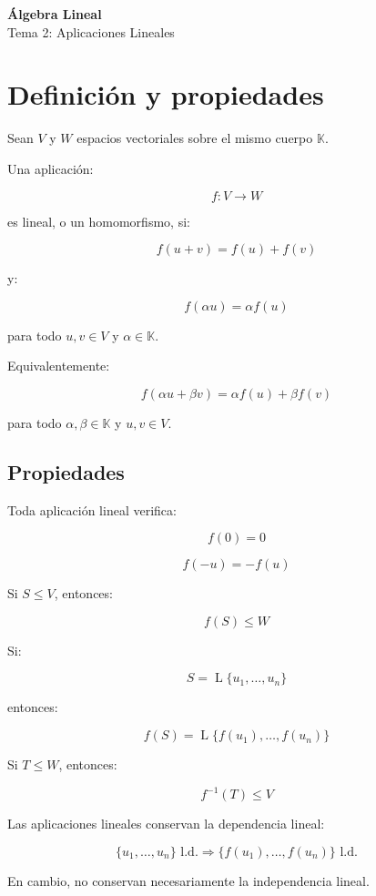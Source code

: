 \documentclass[11pt,a4paper]{article}
\newcommand{\K}{\mathbb{K}}
\newcommand{\Span}{\operatorname{L}}
\begin{document}
\begin{center}
	{\LARGE\bfseries Álgebra Lineal}\\[0.4em]
	{\Large Tema 2: Aplicaciones Lineales}
\end{center}

\tableofcontents
\newpage

\section{Definición y propiedades}

Sean $V$ y $W$ espacios vectoriales sobre el mismo cuerpo $\K$.

Una aplicación:

\[
f:V\longrightarrow W
\]

es lineal, o un homomorfismo, si:

\[
f(u+v)=f(u)+f(v)
\]

y:

\[
f(\alpha u)=\alpha f(u)
\]

para todo $u,v\in V$ y $\alpha\in\K$.

Equivalentemente:

\[
\boxed{
f(\alpha u+\beta v)
=
\alpha f(u)+\beta f(v)
}
\]

para todo $\alpha,\beta\in\K$ y $u,v\in V$.

\subsection{Propiedades}

Toda aplicación lineal verifica:

\[
f(0)=0
\]

\[
f(-u)=-f(u)
\]

Si $S\leq V$, entonces:

\[
f(S)\leq W
\]

Si:

\[
S=\Span\{u_1,\ldots,u_n\}
\]

entonces:

\[
f(S)
=
\Span\{f(u_1),\ldots,f(u_n)\}
\]

Si $T\leq W$, entonces:

\[
f^{-1}(T)\leq V
\]

Las aplicaciones lineales conservan la dependencia lineal:

\[
\{u_1,\ldots,u_n\}
\text{ l.d.}
\Longrightarrow
\{f(u_1),\ldots,f(u_n)\}
\text{ l.d.}
\]

En cambio, no conservan necesariamente la independencia lineal.
\end{document}
